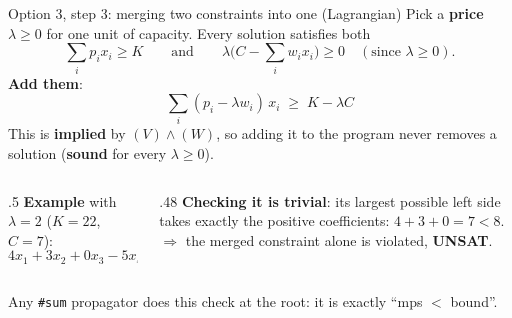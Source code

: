 \documentclass[aspectratio=169,11pt]{beamer}
\begin{document}
\begin{frame}{Option 3, step 3: merging two constraints into one (Lagrangian)}
\footnotesize
Pick a \textbf{price} $\lambda \ge 0$ for one unit of capacity. Every solution satisfies both
\[
\sum_i p_i x_i \ge K \qquad\text{and}\qquad \lambda\Big(C - \sum_i w_i x_i\Big) \ge 0 \quad(\text{since } \lambda\ge0).
\]
\textbf{Add them}:
\[
\boxed{\;\sum_i (p_i - \lambda w_i)\,x_i \;\ge\; K - \lambda C\;}
\]
This is \textbf{implied} by $(V)\wedge(W)$, so adding it to the program never removes a solution (\textbf{sound} for every $\lambda\ge 0$).
\vspace{1mm}
\begin{columns}[T]
\begin{column}{.5\textwidth}
\textbf{Example} with $\lambda = 2$ ($K{=}22$, $C{=}7$):
\[
4x_1 + 3x_2 + 0x_3 - 5x_4 \;\ge\; 22 - 14 = 8.
\]
\end{column}
\begin{column}{.48\textwidth}
\textbf{Checking it is trivial}: its largest possible left side takes exactly the positive coefficients:
$4 + 3 + 0 = 7 < 8$.\\[1mm]
$\Rightarrow$ the merged constraint alone is violated, \textbf{UNSAT}.
\end{column}
\end{columns}
\vspace{2mm}
Any \texttt{\#sum} propagator does this check at the root: it is exactly ``mps $<$ bound''.
\end{frame}
\end{document}

